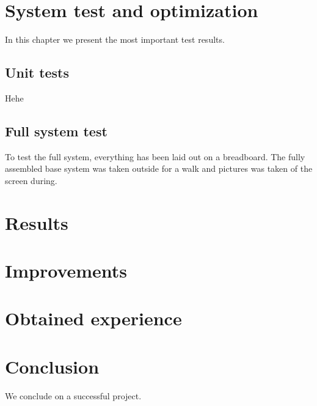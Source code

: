 \chapter{System test and optimization}
In this chapter we present the most important test results.\\
\section{Unit tests}
Hehe

\section{Full system test}
To test the full system, everything has been laid out on a breadboard. The fully assembled base system was taken outside for a walk and pictures was taken of the screen during. 

\chapter{Results}


\chapter{Improvements}


\chapter{Obtained experience}


\chapter{Conclusion}
We conclude on a successful project.



